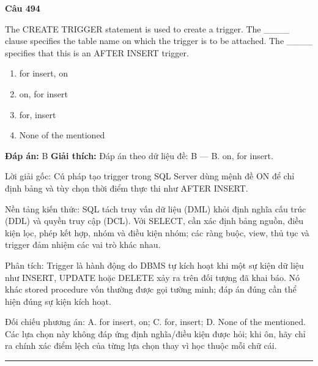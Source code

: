 \documentclass[11pt,a4paper]{article}
\newenvironment{question}[1]{%
  \par\vspace{1em}\noindent\textbf{\large Câu #1}\par\vspace{0.4em}
}{%
  \par\vspace{1em}\hrule\vspace{0.6em}
}
\newenvironment{choices}{%
  \begin{enumerate}[label=\textbf{\Alph*.},leftmargin=2.2em,itemsep=2pt,topsep=3pt]
}{%
  \end{enumerate}
}
\newcommand{\choice}{\item}
\begin{document}
\begin{question}{494}
The CREATE TRIGGER statement is used to create a trigger. The ____ clause specifies the table name on which the trigger is to be attached. The ____ specifies that this is an AFTER INSERT trigger.
\begin{choices}
\choice for insert, on
\choice on, for insert
\choice for, insert
\choice None of the mentioned
\end{choices}
\textbf{Đáp án:} B
\textbf{Giải thích:} Đáp án theo dữ liệu đề: B — B. on, for insert.

Lời giải gốc: Cú pháp tạo trigger trong SQL Server dùng mệnh đề ON để chỉ định bảng và tùy chọn thời điểm thực thi như AFTER INSERT.

Nền tảng kiến thức: SQL tách truy vấn dữ liệu (DML) khỏi định nghĩa cấu trúc (DDL) và quyền truy cập (DCL). Với SELECT, cần xác định bảng nguồn, điều kiện lọc, phép kết hợp, nhóm và điều kiện nhóm; các ràng buộc, view, thủ tục và trigger đảm nhiệm các vai trò khác nhau.

Phân tích: Trigger là hành động do DBMS tự kích hoạt khi một sự kiện dữ liệu như INSERT, UPDATE hoặc DELETE xảy ra trên đối tượng đã khai báo. Nó khác stored procedure vốn thường được gọi tường minh; đáp án đúng cần thể hiện đúng sự kiện kích hoạt.

Đối chiếu phương án: A. for insert, on; C. for, insert; D. None of the mentioned. Các lựa chọn này không đáp ứng định nghĩa/điều kiện được hỏi; khi ôn, hãy chỉ ra chính xác điểm lệch của từng lựa chọn thay vì học thuộc mỗi chữ cái.
\end{question}
\end{document}
